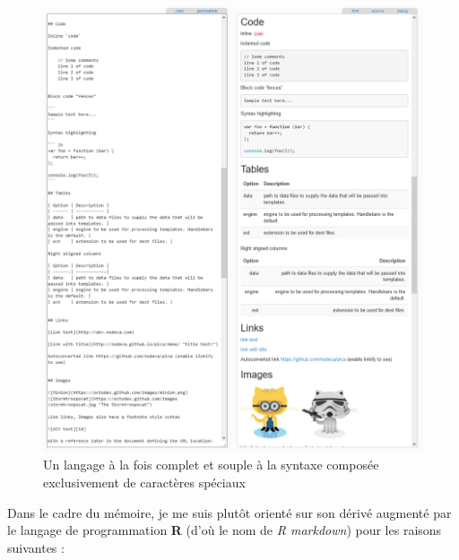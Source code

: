 \documentclass[
  11pt,
  french,
]{article}
\begin{document}
\begin{tcolorbox}
\begin{figure}

{\centering \includegraphics[width=0.9\linewidth]{__imgs/markdown} 

}

\caption[Un langage à la fois complet et souple à la syntaxe composée exclusivement de caractères spéciaux  -  https://markdown-it.github.io/]{Un langage à la fois complet et souple à la syntaxe composée exclusivement de caractères spéciaux}\label{fig:markdown}
\end{figure}
\end{tcolorbox}

Dans le cadre du mémoire, je me suis plutôt orienté sur son dérivé
augmenté par le langage de programmation \textbf{R} (d'où le nom de
\emph{R markdown}) pour les raisons suivantes :
\end{document}
